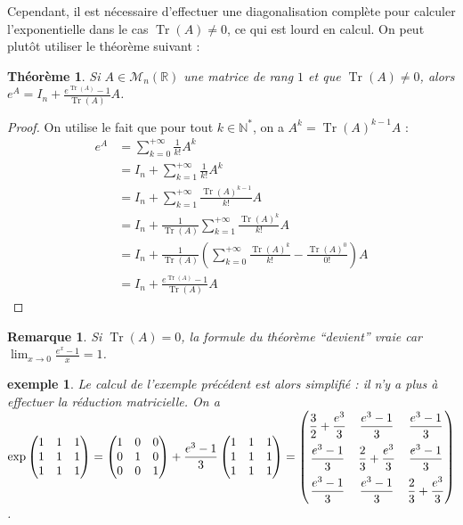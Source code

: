 \documentclass[a4paper]{article}
\newtheorem*{theorem}{Théorème}
\newtheorem*{remark}{Remarque}
\newtheorem*{example}{exemple}
\begin{document}
Cependant, il est nécessaire d'effectuer une diagonalisation complète pour calculer l'exponentielle dans le cas $\operatorname{Tr}(A) \neq 0$, ce qui est lourd en calcul. On peut plutôt utiliser le théorème suivant :

\begin{theorem}
    Si $A \in \mathcal{M}_{n}(\mathbb{R})$ une matrice de rang $1$ et que $\operatorname{Tr}(A) \neq 0$, alors $\displaystyle e^A = I_n + \frac{e^{\operatorname{Tr}(A)}-1}{\operatorname{Tr}(A)}A$.
\end{theorem}

\begin{proof}
    On utilise le fait que pour tout $k \in \mathbb{N}^*$, on a $A^k = \operatorname{Tr}(A)^{k-1}A$ :
    \begin{align*}
        e^A &= \sum_{k=0}^{+\infty} \frac{1}{k!} A^k \\
        &= I_n + \sum_{k=1}^{+\infty} \frac{1}{k!} A^k \\
        &= I_n + \sum_{k=1}^{+\infty} \frac{\operatorname{Tr}(A)^{k-1}}{k!} A\\
        &= I_n + \frac{1}{\operatorname{Tr}(A)}\sum_{k=1}^{+\infty} \frac{\operatorname{Tr}(A)^k}{k!} A \\
        &= I_n + \frac{1}{\operatorname{Tr}(A)} \left(\sum_{k=0}^{+\infty} \frac{\operatorname{Tr}(A)^k}{k!} - \frac{\operatorname{Tr}(A)^0}{0!}\right)A \\
        &= I_n + \frac{e^{\operatorname{Tr}(A)}-1}{\operatorname{Tr}(A)}A
    \end{align*}
\end{proof}

\begin{remark}
    Si $\operatorname{Tr}(A) = 0$, la formule du théorème ``devient'' vraie car $\displaystyle \lim_{x \to 0} \frac{e^x - 1}{x} = 1$.
\end{remark}

\begin{example}
    Le calcul de l'exemple précédent est alors simplifié : il n'y a plus à effectuer la réduction matricielle. On a $\exp\begin{pmatrix} 1 & 1 & 1 \\ 1 & 1 & 1 \\ 1 & 1 & 1 \end{pmatrix} = \begin{pmatrix} 1 & 0 & 0 \\ 0 & 1 & 0 \\ 0 & 0 & 1 \end{pmatrix} + \dfrac{e^3 - 1}{3} \begin{pmatrix} 1 & 1 & 1 \\ 1 & 1 & 1 \\ 1 & 1 & 1 \end{pmatrix} =\setlength{\delimitershortfall}{0pt} \begin{pmatrix} \dfrac{3}{2} + \dfrac{e^3}{3} & \dfrac{e^3-1}{3} & \dfrac{e^3-1}{3} \\[2ex] \dfrac{e^3-1}{3} & \dfrac{2}{3} + \dfrac{e^3}{3} & \dfrac{e^3-1}{3} \\[2ex] \dfrac{e^3-1}{3} & \dfrac{e^3-1}{3} & \dfrac{2}{3} + \dfrac{e^3}{3} \end{pmatrix}$.
\end{example}
\end{document}
